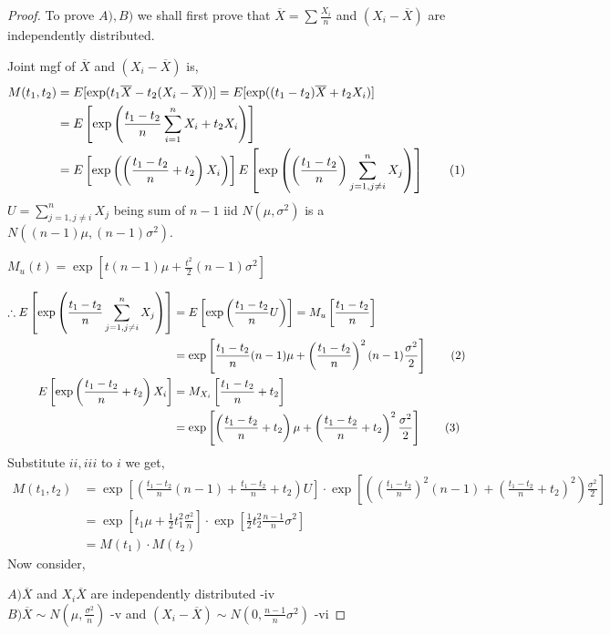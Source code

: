 \documentclass[oneside,11pt,pdftex]{book}%
\numberwithin{equation}{section}
\numberwithin{section}{chapter}
\numberwithin{equation}{chapter}
\newcommand\numberthis{\addtocounter{equation}{1}\tag{\theequation}}
\begin{document}
\begin{proof}
	To prove $ A), B) $ we shall first prove that $ \overline{X} = \sum \frac{X_i}{n} $ and $ (X_i-\overline{X}) $ are independently distributed.
	
	Joint mgf of $ \overline{X} $ and $ (X_i-\overline{X}) $ is,
	\begin{align*}
		M(t_1,t_2)&= E[\exp(t_1\overline{X}-t_2(X_i-\overline{X}))]=E[\exp((t_1-t_2)\overline{X}+t_2X_i)]\\
		&=E \left[\exp \left(\frac{t_1-t_2}{n}\sum_{i=1}^n X_i + t_2 X_i\right)\right]\\
		&=E\left[\exp \left( \left( \frac{t_1-t_2}{n}+t_2 \right)X_i \right)\right]E\left[\exp \left( \left(\frac{t_1-t_2}{n}\right)\sum_{j=1, j\neq i }^n X_j\right)\right] \numberthis
	\end{align*}
$ U=\sum_{j=1, j\neq i}^n X_j$ being sum of $ n-1 $ iid $ N(\mu, \sigma^2) $ is a $ N((n-1)\mu, (n-1)\sigma^2) $.

$ M_u(t)=\exp\left[t(n-1)\mu+\frac{t^2}{2}(n-1)\sigma^2\right] $

\begin{align*}
	\therefore E\left[\exp \left( \frac{t_1-t_2}{n} \sum_{j=1, j\neq i}^n X_j \right)\right]&= E\left[\exp \left(\frac{t_1-t_2}{n} U\right)\right]=M_u\left[\frac{t_1-t_2}{n}\right]\\
	&=\exp \left[\frac{t_1-t_2}{n}(n-1)\mu + \left(\frac{t_1-t_2}{n}\right)^2 (n-1)\frac{\sigma^2}{2}\right] \numberthis \\
	E\left[\exp \left(\frac{t_1-t_2}{n}+t_2\right)X_i\right]&=M_{X_i}\left[\frac{t_1-t_2}{n}+t_2\right]\\
	&=\exp \left[\left(\frac{t_1-t_2}{n}+t_2\right)\mu + \left(\frac{t_1-t_2}{n}+t_2\right)^2 \frac{\sigma^2}{2}\right] \numberthis
\end{align*}
Substitute $ ii, iii $ to $ i $ we get,
\begin{align*}
	M(t_1,t_2)&=\exp\left[\left(\frac{t_1-t_2}{n}(n-1)+\frac{t_1-t_2}{n}+t_2\right)U\right] \cdot \exp \left[\left(\left(\frac{t_1-t_2}{n}\right)^2(n-1)+\left(\frac{t_1-t_2}{n}+t_2\right)^2\right)\frac{\sigma^2}{2}\right]\\
	&=\exp\left[t_1\mu+\frac{1}{2}t_1^2 \frac{\sigma^2}{n}\right] \cdot \exp\left[\frac{1}{2} t_2^2 \frac{n-1}{n} \sigma^2\right]\\
	&=M(t_1)\cdot M(t_2)
\end{align*}
Now consider,

$ A) \overline{X}$ and $ X_i\overline{X} $ are independently distributed -iv\\
$ B) \overline{X} \sim N \left(\mu, \frac{\sigma^2}{n}\right)$ -v and $ (X_i-\overline{X}) \sim N \left(0, \frac{n-1}{n}\sigma^2\right)$ -vi


\end{proof}
\end{document}
